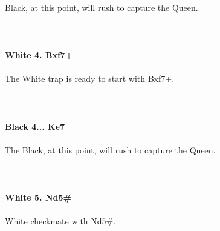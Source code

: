 \documentclass{article}
\begin{document}
\\
Black, at this point, will rush to capture the Queen.\\
\\

\\
\\
\textbf{White 4. Bxf7+}\\
\\
The White trap is ready to start with Bxf7+.\\
\\

\\
\\
\textbf{Black 4... Ke7}\\
\\
The Black, at this point, will rush to capture the Queen.\\
\\

\\
\\
\textbf{White 5. Nd5\#}\\
\\
White checkmate with Nd5\#.\\
\\
\end{document}
